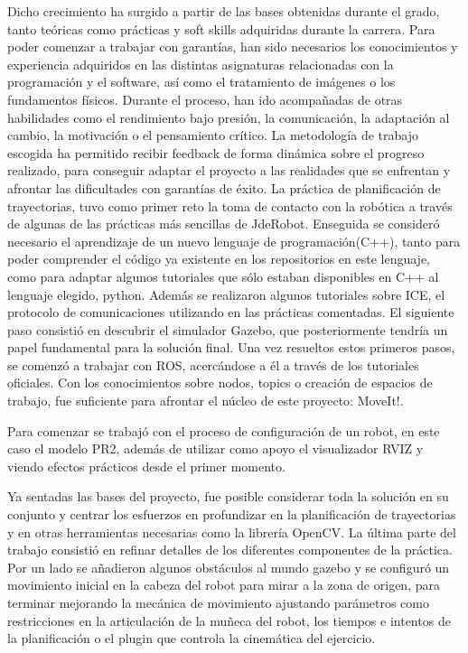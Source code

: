 \documentclass[12pt,spanish,chapterprefix, numbers=noenddot]{book}
\numberwithin{equation}{section}
\numberwithin{figure}{section}
\begin{document}
Dicho crecimiento ha surgido a partir de las bases obtenidas durante el grado, tanto teóricas como prácticas y soft skills adquiridas durante la carrera. Para poder comenzar a trabajar con garantías, han sido necesarios los conocimientos y experiencia adquiridos en las distintas asignaturas relacionadas con la programación y el software, así como el tratamiento de imágenes o los fundamentos físicos. Durante el proceso, han ido acompañadas de otras habilidades como el rendimiento bajo presión, la comunicación, la adaptación al cambio, la motivación o el pensamiento crítico. La metodología de trabajo escogida ha permitido recibir feedback de forma dinámica sobre el progreso realizado, para conseguir adaptar el proyecto a las realidades que se enfrentan y afrontar las dificultades con garantías de éxito.
La práctica de planificación de trayectorias, tuvo como primer reto la toma de contacto con la robótica a través de algunas de las prácticas más sencillas de JdeRobot. Enseguida se consideró necesario el aprendizaje de un nuevo lenguaje de programación(C++), tanto para poder comprender el código ya existente en los repositorios en este lenguaje, como para adaptar algunos tutoriales que sólo estaban disponibles en C++ al lenguaje elegido, python. Además se realizaron algunos tutoriales sobre ICE, el protocolo de comunicaciones utilizando en las prácticas comentadas. El siguiente paso consistió en descubrir el simulador Gazebo, que posteriormente tendría un papel fundamental para la solución final. Una vez resueltos estos primeros pasos, se comenzó a trabajar con ROS, acercándose a él a través de los tutoriales oficiales. Con los conocimientos sobre nodos, topics o creación de espacios de trabajo, fue suficiente para afrontar el núcleo de este proyecto: MoveIt!. 

Para comenzar se trabajó con el proceso de configuración de un robot, en este caso el modelo PR2, además de utilizar como apoyo el visualizador RVIZ y viendo efectos prácticos desde el primer momento.

Ya sentadas las bases del proyecto, fue posible considerar toda la solución en su conjunto y centrar los esfuerzos en profundizar en la planificación de trayectorias y en otras herramientas necesarias como la librería OpenCV. La última parte del trabajo consistió en refinar detalles de los diferentes componentes de la práctica. Por un lado se añadieron algunos obstáculos al mundo gazebo y se configuró un movimiento inicial en la cabeza del robot para mirar a la zona de origen, para terminar mejorando la mecánica de movimiento ajustando parámetros como restricciones en la articulación de la muñeca del robot, los tiempos e intentos de la planificación o el plugin que controla la cinemática del ejercicio.
\end{document}
